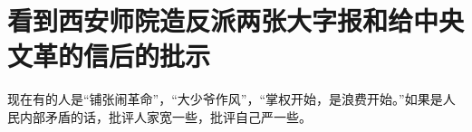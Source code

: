 \section[看到西安师院造反派两张大字报和给中央文革的信后的批示（一九六七年六月）]{看到西安师院造反派两张大字报和给中央文革的信后的批示}


现在有的人是“铺张闹革命”，“大少爷作风”，“掌权开始，是浪费开始。”如果是人民内部矛盾的话，批评人家宽一些，批评自己严一些。


